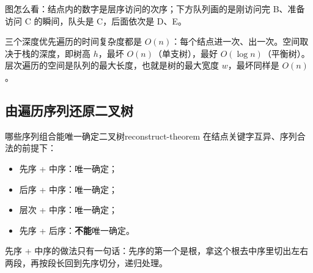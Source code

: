 \smallskip
{\footnotesize\color{MutedText}图怎么看：结点内的数字是层序访问的次序；下方队列画的是刚访问完 B、准备访问 C 的瞬间，队头是 C，后面依次是 D、E。}

三个深度优先遍历的时间复杂度都是 $O(n)$：每个结点进一次、出一次。空间取决于栈的深度，即树高 $h$，最坏 $O(n)$（单支树），最好 $O(\log n)$（平衡树）。层次遍历的空间是队列的最大长度，也就是树的最大宽度 $w$，最坏同样是 $O(n)$。

\subsection{由遍历序列还原二叉树}

\begin{conclusion}{哪些序列组合能唯一确定二叉树}{reconstruct-theorem}
在结点关键字互异、序列合法的前提下：
\begin{itemize}
  \item 先序 + 中序：唯一确定；
  \item 后序 + 中序：唯一确定；
  \item 层次 + 中序：唯一确定；
  \item 先序 + 后序：\textbf{不能}唯一确定。
\end{itemize}
\end{conclusion}

先序 + 中序的做法只有一句话：先序的第一个是根，拿这个根去中序里切出左右两段，再按段长回到先序切分，递归处理。

